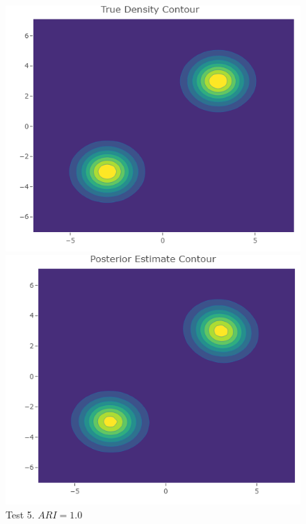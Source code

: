 \begin{figure}[h]
\begin{multicols}{2}
    \end{multicols}
\begin{multicols}{2}
    \includegraphics[width=\linewidth]{etc/true_contour.png}\par

    \includegraphics[width=\linewidth]{etc/posterior_contour.png}\par
\end{multicols}
\captionsetup{labelformat=empty}
\caption{Test 5. $ARI = 1.0$}
\end{figure}

